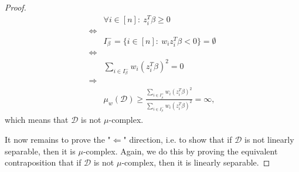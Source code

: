 \begin{proof}
\begin{align*}
                & \forall i \in [n]:\ z_i^T\beta \geq 0                                                                                    \\
    \iff        &                                                                                                                          \\
                & I_\beta^- = \{ i \in [n]:\ w_iz_i^T\beta < 0\} = \emptyset                                                               \\
    \iff        &                                                                                                                          \\
                & \sum_{i \in I_\beta^-} w_i (z_i^T \beta)^2 = 0                                                                           \\
    \Rightarrow &                                                                                                                          \\
                & \mu_w(\mathcal{D}) \geq \frac{\sum_{i \in I_\beta^+} w_i (z_i^T \beta)^2}
    {\sum_{i \in I_\beta^-} w_i (z_i^T \beta)^2} = \infty,
\end{align*}
\endgroup
which means that $\mathcal{D}$ is not $\mu$-complex.

It now remains to prove the "$\Leftarrow$" direction, i.e. to
show that if $\mathcal{D}$ is not linearly separable,
then it is $\mu$-complex. Again, we do this by proving the
equivalent contraposition that if $\mathcal{D}$ is not
$\mu$-complex, then it is linearly separable.


\end{proof}
